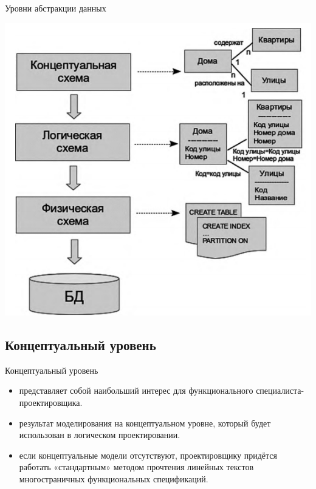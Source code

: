 \documentclass{beamer}
\begin{document}
\begin{frame}
\begin{block}{Уровни абстракции данных}
\begin{center}
\includegraphics[scale=0.5]{images/levels-01.png}
\end{center}
\end{block}
\end{frame}

\subsection{Концептуальный уровень}
\begin{frame}
\begin{block}{Концептуальный уровень}
\begin{itemize}
\item представляет собой наибольший интерес для функционального специалиста-проектировщика.
\item результат моделирования на концептуальном уровне, который будет использован в логическом проектировании.
\item если концептуальные модели отсутствуют, проектировщику придётся работать «стандартным» методом прочтения линейных текстов многостраничных функциональных спецификаций.
\end{itemize}
\end{block}
\end{frame} 
\end{document}
